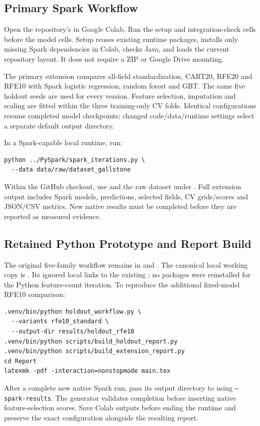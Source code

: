 \subsection{Primary Spark Workflow}
Open the repository's  in Google Colab. Run the setup and integration-check cells before the model cells. Setup reuses existing runtime packages, installs only missing Spark dependencies in Colab, checks Java, and loads the current repository layout. It does not require a ZIP or Google Drive mounting.

The primary extension compares all-field standardization, CART20, RFE20 and RFE10 with Spark logistic regression, random forest and GBT. The same five holdout seeds are used for every version. Feature selection, imputation and scaling are fitted within the three training-only CV folds. Identical configurations resume completed model checkpoints; changed code/data/runtime settings select a separate default output directory.

In a Spark-capable local runtime, run:
\begin{verbatim}
python ../PySpark/spark_iterations.py \
  --data data/raw/dataset_gallstone
\end{verbatim}
Within the GitHub checkout, use  and the raw dataset under . Full extension output includes Spark models, predictions, selected fields, CV grids/scores and JSON/CSV metrics. New native results must be completed before they are reported as measured evidence.

\subsection{Retained Python Prototype and Report Build}
The original five-family workflow remains in  and . The canonical local working copy is . Its ignored local  links to the existing ; no packages were reinstalled for the Python feature-count iteration. To reproduce the additional fixed-model RFE10 comparison:
\begin{verbatim}
.venv/bin/python holdout_workflow.py \
  --variants rfe10_standard \
  --output-dir results/holdout_rfe10
.venv/bin/python scripts/build_holdout_report.py
.venv/bin/python scripts/build_extension_report.py
cd Report
latexmk -pdf -interaction=nonstopmode main.tex
\end{verbatim}
After a complete new native Spark run, pass its output directory to  using \texttt{--spark-results}. The generator validates completion before inserting native feature-selection scores. Save Colab outputs before ending the runtime and preserve the exact configuration alongside the resulting report.
